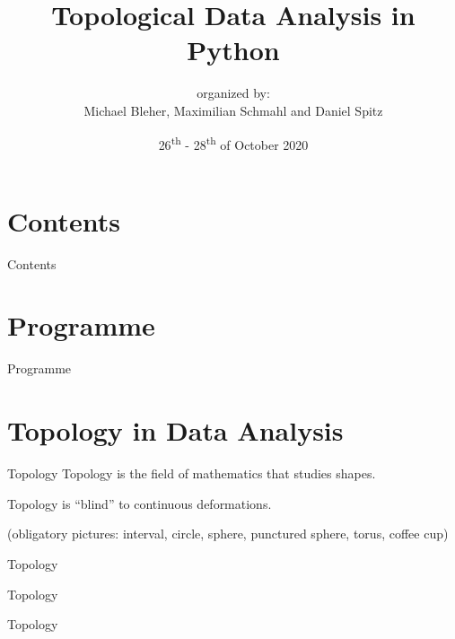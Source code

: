 \documentclass{beamer}
\title{
\vspace{0.3cm}
\Large{Topological Data Analysis in Python}}
\date{26\textsuperscript{th} - 28\textsuperscript{th} of October 2020}
\author[Michael Bleher]{organized by: \\  Michael Bleher, Maximilian Schmahl and Daniel Spitz}
\institute{Heidelberg University}
\begin{document}
\titlepage




\section*{Contents}
\begin{frame}[plain]{Contents}
\setcounter{tocdepth}{1}
\tableofcontents
\end{frame}


\section{Programme}
\begin{frame}{Programme}

\end{frame}


\section{Topology in Data Analysis}
\begin{frame}{Topology}
Topology is the field of mathematics that studies shapes.

Topology is ``blind'' to continuous deformations.

(obligatory pictures: interval, circle, sphere, punctured sphere, torus, coffee cup)
\end{frame}

\begin{frame}{Topology}

\end{frame}

\begin{frame}{Topology}

\end{frame}

\begin{frame}{Topology}

\end{frame}
\end{document}
